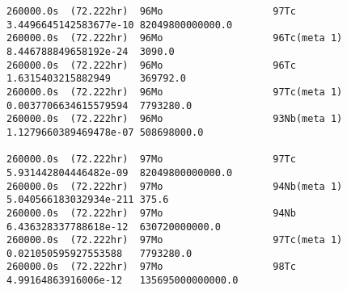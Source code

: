 \begin{lstlisting}[style=sOutputFile,caption={Final results for steel irradiation},label={listing:alexsteel}]
260000.0s  (72.222hr)  96Mo                   97Tc                   3.4496645142583677e-10 82049800000000.0      
260000.0s  (72.222hr)  96Mo                   96Tc(meta 1)           8.446788849658192e-24  3090.0                
260000.0s  (72.222hr)  96Mo                   96Tc                   1.6315403215882949     369792.0              
260000.0s  (72.222hr)  96Mo                   97Tc(meta 1)           0.0037706634615579594  7793280.0             
260000.0s  (72.222hr)  96Mo                   93Nb(meta 1)           1.1279660389469478e-07 508698000.0           

260000.0s  (72.222hr)  97Mo                   97Tc                   5.931442804446482e-09  82049800000000.0      
260000.0s  (72.222hr)  97Mo                   94Nb(meta 1)           5.040566183032934e-211 375.6                 
260000.0s  (72.222hr)  97Mo                   94Nb                   6.436328337788618e-12  630720000000.0        
260000.0s  (72.222hr)  97Mo                   97Tc(meta 1)           0.021050595927553588   7793280.0             
260000.0s  (72.222hr)  97Mo                   98Tc                   4.99164863916006e-12   135695000000000.0     






\end{lstlisting}
